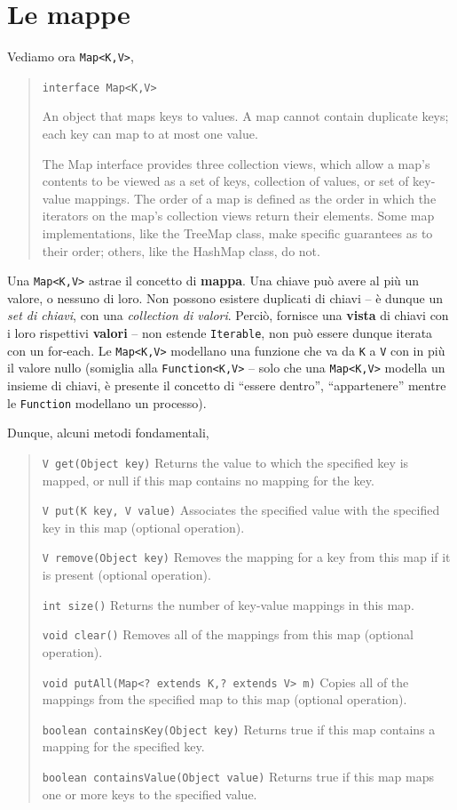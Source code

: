 \documentclass[\fontsizeclass,twocolumn]{\classname}
\theoremstyle{definition}
\theoremstyle{definition}
\begin{document}
\section{Le mappe}

Vediamo ora \texttt{Map<K,V>},
\begin{quote}
    \footnotesize{\texttt{interface Map<K,V>}

An object that maps keys to values. A map cannot contain duplicate keys; each key can map to at most one value.

The Map interface provides three collection views, which allow a map's contents to be viewed as a set of keys, collection of values, or set of key-value mappings. The order of a map is defined as the order in which the iterators on the map's collection views return their elements. Some map implementations, like the TreeMap class, make specific guarantees as to their order; others, like the HashMap class, do not.
}
\end{quote}

Una \texttt{Map<K,V>} astrae il concetto di \textbf{mappa}. Una chiave può
avere al più un valore, o nessuno di loro. Non possono esistere duplicati di
chiavi -- è dunque un \emph{set di chiavi}, con una \emph{collection di
valori}. Perciò, fornisce una \textbf{vista} di chiavi con i loro rispettivi
\textbf{valori} -- non estende \texttt{Iterable}, non può essere dunque iterata
con un for\--each. Le \texttt{Map<K,V>} modellano una funzione che va da
\texttt{K} a \texttt{V} con in più il valore nullo (somiglia alla
\texttt{Function<K,V>} -- solo che una \texttt{Map<K,V>} modella un insieme di
chiavi, è presente il concetto di ``essere dentro'', ``appartenere'' mentre le
\texttt{Function} modellano un processo).

Dunque, alcuni metodi fondamentali,
\begin{quote}
    \footnotesize{\texttt{V 	get(Object key)} 	Returns the value to which the specified key is mapped, or null if this map contains no mapping for the key.

\texttt{V 	put(K key, V value)} 	Associates the specified value with the specified key in this map (optional operation).

\texttt{V 	remove(Object key)} 	Removes the mapping for a key from this map if it is present (optional operation).

\texttt{int 	size()} 	Returns the number of key-value mappings in this map.

\texttt{void 	clear()} 	Removes all of the mappings from this map (optional operation).

\texttt{void 	putAll(Map<? extends K,? extends V> m)} 	Copies all of the mappings from the specified map to this map (optional operation).

\texttt{boolean 	containsKey(Object key)} 	Returns true if this map contains a mapping for the specified key.

\texttt{boolean 	containsValue(Object value)} 	Returns true if this map maps one or more keys to the specified value.

}
\end{quote}
\end{document}
